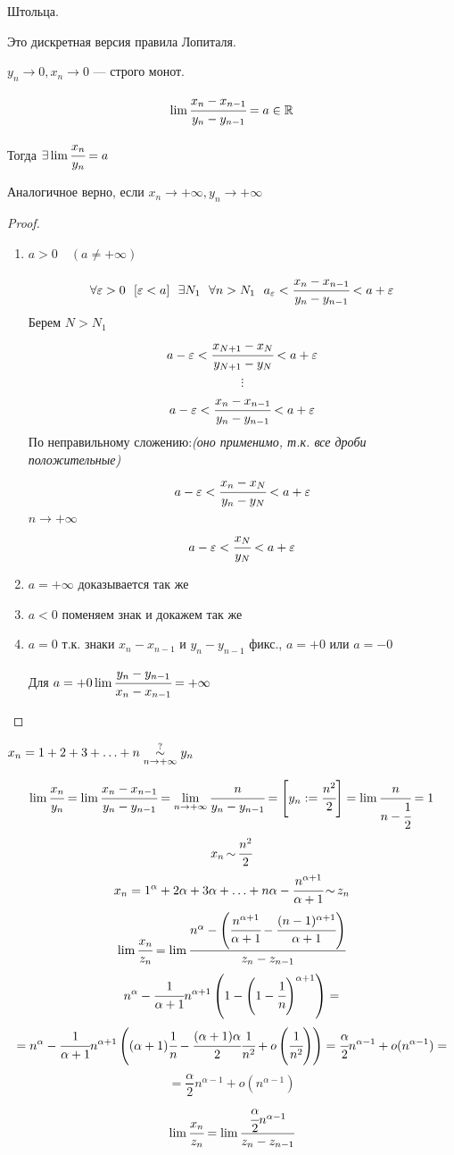 \begin{theorem}
    Штольца.

    Это дискретная версия правила Лопиталя.

    $y_n\to0, x_n\to0$ --- строго монот.

    $$\lim\cfrac{x_n-x_{n-1}}{y_n-y_{n-1}}=a\in\mathbb{R}$$

    Тогда $\exists\lim\cfrac{x_n}{y_n}=a$
\end{theorem}
\begin{remark}
    Аналогичное верно, если $x_n\to+\infty, y_n\to+\infty$
\end{remark}
\begin{proof}
    \begin{enumerate}
        \item $a>0 \quad (a\not=+\infty)$
        
        $$\forall \varepsilon > 0 \ \ [\varepsilon<a] \ \ \exists N_1 \ \ \forall n>N_1 \ \ a_\varepsilon<\cfrac{x_n-x_{n-1}}{y_n-y_{n-1}}<a+\varepsilon$$
        Берем $N>N_1$
        $$a-\varepsilon<\cfrac{x_{N+1}-x_{N}}{y_{N+1}-y_{N}}<a+\varepsilon$$
        $$\vdots$$
        $$a-\varepsilon<\cfrac{x_{n}-x_{n-1}}{y_{n}-y_{n-1}}<a+\varepsilon$$
        По неправильному сложению:\textit{(оно применимо, т.к. все дроби положительные)}
        $$a-\varepsilon<\cfrac{x_n-x_N}{y_n-y_N}<a+\varepsilon$$
        $n\to+\infty$
        $$a-\varepsilon<\cfrac{x_N}{y_N}<a+\varepsilon$$

        \item $a=+\infty$ доказывается так же
        \item $a<0$ поменяем знак и докажем так же
        \item $a=0$ т.к. знаки $x_n-x_{n-1}$ и $y_n-y_{n-1}$ фикс., $a=+0$ или $a=-0$
        
        Для $a=+0 \lim\cfrac{y_n-y_{n-1}}{x_n-x_{n-1}}=+\infty$
    \end{enumerate}
\end{proof}

$x_n=1+2+3+\ldots+n\stackrel{?}{\operatorname*{\sim}\limits_{n\to+\infty}}y_n$

$$\lim\cfrac{x_n}{y_n}=\lim\cfrac{x_n-x_{n-1}}{y_n-y_{n-1}}=\lim\limits_{n\to+\infty}\cfrac{n}{y_n-y_{n-1}}=\left[y_n:=\cfrac{n^2}{2}\right]=\lim\cfrac{n}{n-\cfrac{1}{2}}=1$$
$$x_n\operatorname*{\sim} \cfrac{n^2}{2}$$
$$x_n=1^\alpha+2\alpha+3\alpha+\ldots+n\alpha-\cfrac{n^{\alpha+1}}{\alpha+1}\operatorname*{\sim} z_n$$
$$\lim\cfrac{x_n}{z_n}=\lim\cfrac{n^\alpha-\left(\cfrac{n^{\alpha+1}}{\alpha+1}-\cfrac{(n-1)^{\alpha+1}}{\alpha+1}\right)}{z_n-z_{n-1}}$$
$$n^\alpha-\cfrac{1}{\alpha+1}n^{\alpha+1}\left(1-\left(1-\cfrac{1}{n}\right)^{\alpha+1}\right)=$$
$$=n^\alpha-\cfrac{1}{\alpha+1}n^{\alpha+1}\left((\alpha+1)\cfrac{1}{n}-\cfrac{(\alpha+1)\alpha}{2}\cfrac{1}{n^2}+o\left(\cfrac{1}{n^2}\right)\right)=\cfrac{\alpha}{2}n^{\alpha-1}+o(n^{\alpha-1})=$$
$$=\frac{\alpha}{2}n^{\alpha-1}+o(n^{\alpha-1})$$
$$\lim\cfrac{x_n}{z_n}=\lim\cfrac{\cfrac{\alpha}{2}n^{\alpha-1}}{z_n-z_{n-1}}$$

